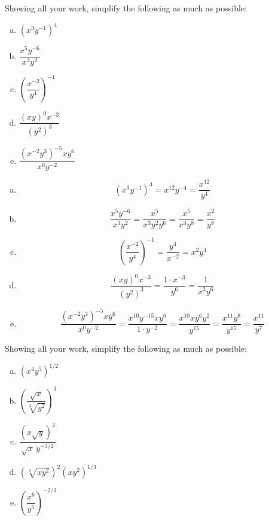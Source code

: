 \documentclass[11pt,letterpaper]{article}
\begin{document}

 Showing all your work, simplify the following as much as possible:
\begin{enumerate}[(a)]
\item $(x^3 y^{-1})^4$
\item $\dfrac{x^5y^{-6}}{x^3y^2}$
\item $\left( \dfrac{x^{-2}}{y^4} \right)^{-1}$
\item $\dfrac{(xy)^0 x^{-3}}{(y^2)^3}$
\item $\dfrac{(x^{-2} y^3)^{-5} xy^6}{x^0 y^{-2}}$
\end{enumerate} \pspace

\sol
\begin{enumerate}[(a)]
\item 
	\[
	(x^3 y^{-1})^4= x^12 y^{-4}= \dfrac{x^{12}}{y^4}
	\] \pspace

\item 
	\[
	\dfrac{x^5y^{-6}}{x^3y^2}= \dfrac{x^5}{x^3 y^2 y^6}= \dfrac{x^5}{x^3 y^8}= \dfrac{x^2}{y^8}
	\] \pspace

\item 
	\[
	\left( \dfrac{x^{-2}}{y^4} \right)^{-1}= \dfrac{y^4}{x^{-2}}= x^2 y^4
	\] \pspace

\item 
	\[
	\dfrac{(xy)^0 x^{-3}}{(y^2)^3}= \dfrac{1 \cdot x^{-3}}{y^6}= \dfrac{1}{x^3 y^6}
	\] \pspace

\item 
	\[
	\dfrac{(x^{-2} y^3)^{-5} xy^6}{x^0 y^{-2}}= \dfrac{x^{10} y^{-15} x y^6}{1 \cdot y^{-2}}= \dfrac{x^{10} x y^6 y^2}{y^{15}}= \dfrac{x^{11} y^8}{y^{15}}= \dfrac{x^{11}}{y^7}
	\]
\end{enumerate}



\newpage



 Showing all your work, simplify the following as much as possible:
\begin{enumerate}[(a)]
\item $(x^4 y^5)^{1/2}$
\item $\left( \dfrac{\sqrt{x}}{\sqrt[3]{y^2}} \right)^3$
\item $\dfrac{(x \sqrt{y})^{3}}{\sqrt{x}\, y^{-3/2}}$
\item $(\sqrt[3]{x y^2})^2 (xy^2)^{1/3}$
\item $\left( \dfrac{x^6}{y^5} \right)^{-2/3}$
\end{enumerate} \pspace
\end{document}
